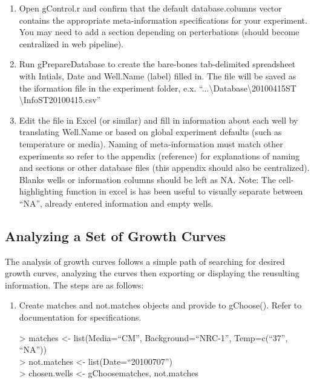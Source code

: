 \documentclass[11pt]{article}
\newenvironment{example}
{\ttfamily \footnotesize >}
{\normalsize \rmfamily}
\newcommand{\inlex}[1]{\ttfamily\small{#1}\rmfamily}
\begin{document}
\begin{spacing}{.1}
\begin{enumerate}
\item Open \inlex{gControl.r} and confirm that the default \inlex{database.columns} vector contains the appropriate meta-information specifications for your experiment. You may need to add a section depending on perterbations (should become centralized in web pipeline).

\item Run \inlex{gPrepareDatabase} to create the bare-bones tab-delimited spreadsheet with \inlex{Intials}, \inlex{Date} and \inlex{Well.Name} (label) filled in. The file will be saved as the iformation file in the experiment folder, e.x. \inlex{``...\textbackslash Database\textbackslash 20100415ST \textbackslash InfoST20100415.csv''}

\item Edit the file in Excel (or similar) and fill in information about each well by translating \inlex{Well.Name} or based on global experiment defaults (such as temperature or media). Naming of meta-information must match other experiments so refer to the appendix (reference) for explanations of naming and sections or other database files (this appendix should also be centralized). Blanks wells or information columns should be left as NA. \footnotesize{Note: The cell-highlighting function in excel is has been useful to visually separate between ``NA'', already entered information and empty wells.}

\end{enumerate}


\subsection{Analyzing a Set of Growth Curves}

The analysis of growth curves follows a simple path of searching for desired growth curves, analyzing the curves then exporting or displaying the reusulting information. The steps are as follows:

\begin{enumerate}
\item Create \inlex{matches} and \inlex{not.matches} objects and provide to \inlex{gChoose()}. Refer to documentation for specifications.

\begin{example}
matches <- list(Media=``CM'', Background=``NRC-1'', Temp=c(``37'', ``NA''))\\
> not.matches <- list(Date=``20100707'')\\
> chosen.wells <- gChoose{matches, not.matches}
\end{example}


\end{enumerate}
\end{spacing}
\end{document}
